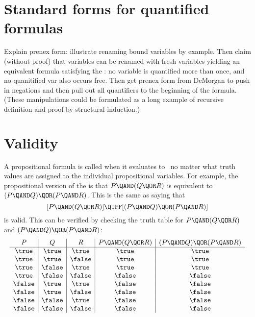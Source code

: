 \section{Standard forms for quantified formulas}
\begin{editingnotes}
Explain prenex form: illustrate renaming bound variables by example.
Then claim (without proof) that variables can be renamed with fresh
variables yielding an equivalent formula satisfying the : no variable is quantified more than once, and no
quanitified var also occurs free.  Then get prenex form from DeMorgan
to push in negations and then pull out all quantifiers to the
beginning of the formula.  (These manipulations could be formulated as
a long example of recursive definition and proof by structural
induction.)
\end{editingnotes}


\section{Validity}\label{sec:validity}

A propositional formula is called  when it evaluates to \true\
no matter what truth values are assigned to the individual propositional
variables.  For example, the propositional version of the 
is that $P \QAND (Q \QOR R)$ is equivalent to $(P \QAND Q) \QOR (P \QAND
R)$.  This is the same as saying that
\begin{equation}\label{eq:distributive_law}
[P \QAND (Q \QOR R)] \QIFF [(P \QAND Q) \QOR (P \QAND R)]
\end{equation}
is valid.  This can be verified by checking the truth table for $P
\QAND (Q \QOR R)$ and $(P \QAND Q) \QOR (P \QAND R)$:
\begin{equation*}
\begin{array}{c|c|c|c|c}

P & Q & R & P \QAND (Q \QOR R) & (P \QAND Q) \QOR (P \QAND R) \\
\hline

\true & \true  & \true   & \true  & \true \\
\true & \true  & \false  & \true  & \true \\
\true & \false & \true   & \true  & \true \\
\true & \false & \false  & \false & \false \\

\false & \true  & \true  & \false & \false \\
\false & \true  & \false & \false & \false \\
\false & \false & \true  & \false & \false \\
\false & \false & \false & \false & \false

\end{array}
\end{equation*}


